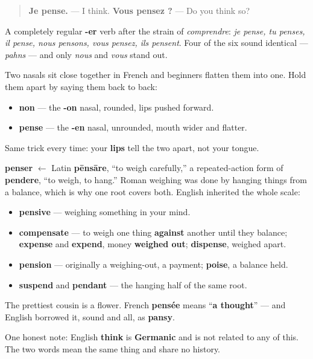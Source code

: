 \begin{quote}
\textbf{Je pense.} — I think. \textbf{Vous pensez ?} — Do you think so?
\end{quote}

A completely regular \textbf{-er} verb after the strain of \emph{comprendre}: \emph{je pense, tu penses, il pense, nous pensons, vous pensez, ils pensent}. Four of the six sound identical — \emph{pahns} — and only \emph{nous} and \emph{vous} stand out.

\begin{sounds}
Two nasals sit close together in French and beginners flatten them into one. Hold them apart by saying them back to back:

\begin{itemize}
\raggedright
  \item \textbf{non} — the \textbf{-on} nasal, rounded, lips pushed forward.
  \item \textbf{pense} — the \textbf{-en} nasal, unrounded, mouth wider and flatter.
\end{itemize}

Same trick every time: your \textbf{lips} tell the two apart, not your tongue.
\end{sounds}

\begin{cousinweb}
\textbf{penser} $\leftarrow$ Latin \textbf{pēnsāre}, \textquotedblleft{}to weigh carefully,\textquotedblright{} a repeated-action form of \textbf{pendere}, \textquotedblleft{}to weigh, to hang.\textquotedblright{} Roman weighing was done by hanging things from a balance, which is why one root covers both. English inherited the whole scale:

\begin{itemize}
\raggedright
  \item \textbf{pensive} — weighing something in your mind.
  \item \textbf{compensate} — to weigh one thing \textbf{against} another until they balance; \textbf{expense} and \textbf{expend}, money \textbf{weighed out}; \textbf{dispense}, weighed apart.
  \item \textbf{pension} — originally a weighing-out, a payment; \textbf{poise}, a balance held.
  \item \textbf{suspend} and \textbf{pendant} — the hanging half of the same root.
\end{itemize}

The prettiest cousin is a flower. French \textbf{pensée} means \textquotedblleft{}\textbf{a thought}\textquotedblright{} — and English borrowed it, sound and all, as \textbf{pansy}.

One honest note: English \textbf{think} is \textbf{Germanic} and is not related to any of this. The two words mean the same thing and share no history.
\end{cousinweb}

